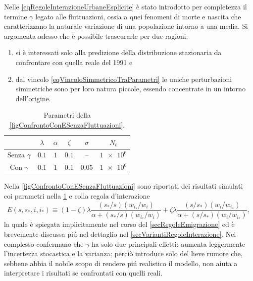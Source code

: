       Nelle \ref{eqRegoleInterazioneUrbaneEsplicite} è stato introdotto per completezza il termine \(\gamma\) legato alle fluttuazioni, ossia a quei fenomeni di morte e nascita che caratterizzano la naturale variazione di una popolazione intorno a una media. Si argomenta adesso che è possibile trascurarle per due ragioni:

      \begin{enumerate}[
        label=\arabic*.,
      ]
        \item si è interessati solo alla predizione della distribuzione stazionaria da confrontare con quella reale del 1991 e
        \item dal vincolo \cref{eqVincoloSimmetricoTraParametri} le uniche perturbazioni simmetriche sono per loro natura piccole, essendo concentrate in un intorno dell'origine.
      \end{enumerate}

      \begin{table}[b]%
        \centering
        \caption{Parametri della \cref{figConfrontoConESenzaFluttuazioni}.}
        \begin{tabular}{cccccc}
          \hline
          &\(\lambda\)&\(\alpha\)&\(\zeta\)&\(\sigma\)&\(N_t\)\\
          \hline
          Senza \(\gamma\)&\(\num{0.1}\)&\(\num{1}\)&\(\num{0.1}\)&--&\(\num{1e6}\)\\
          Con \(\gamma\)&\(\num{0.1}\)&\(\num{1}\)&\(\num{0.1}\)&\(\num{0.05}\)&\(\num{1e6}\)\\
          \hline
        \end{tabular}
        \label{tabParametriConEsenzaGamma}
      \end{table}

      Nella \cref{figConfrontoConESenzaFluttuazioni} sono riportati dei risultati simulati coi parametri nella \cref{tabParametriConEsenzaGamma} e colla regola d'interazione
      \begin{equation}
        \label{eqVarianteRegolaEmigrazioneTagliaForzaFrazionata}
        E(s,s_*,i,i_*)\equiv
        (1-\zeta)\lambda\frac{(s_*/s)(w_{i_*}/w_i)}{\alpha+(s_*/s)(w_{i_*}/w_i)}
        +\zeta\lambda\frac{(s/s_*)(w_i/w_{i_*})}{\alpha+(s/s_*)(w_i/w_{i_*})},
      \end{equation}
      la quale è spiegata implicitamente nel corso del \cref{secRegoleEmigrazione} ed è brevemente discussa piú nel dettaglio nel \cref{secVariantiRegoleInterazione}. Nel complesso confermano che \(\gamma\) ha solo due principali effetti: aumenta leggermente l'incertezza stocastica e la varianza; perciò introduce solo del lieve rumore che, sebbene abbia il nobile scopo di rendere piú realistico il modello, non aiuta a interpretare i risultati se confrontati con quelli reali.

